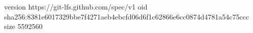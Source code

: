 version https://git-lfs.github.com/spec/v1
oid sha256:8381e6017329bbe7f4271aeb4ebcfd06d6f1c62866e6cc0874d4781a54c75ccc
size 5592560
